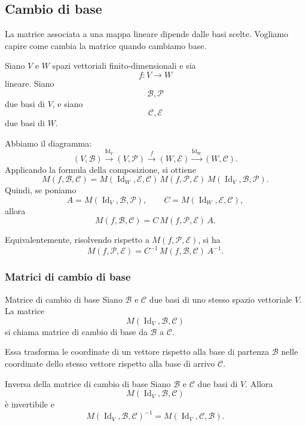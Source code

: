 \documentclass[a4paper]{article}
\begin{document}
\subsection{Cambio di base}

La matrice associata a una mappa lineare dipende dalle basi scelte. Vogliamo capire come cambia la matrice quando cambiamo base.

Siano \(V\) e \(W\) spazi vettoriali finito-dimensionali e sia
\[
    f:V\to W
\]
lineare. Siano
\[
    \mathcal{B},\mathcal{P}
\]
due basi di \(V\), e siano
\[
    \mathcal{C},\mathcal{E}
\]
due basi di \(W\).

Abbiamo il diagramma:
\[
    (V,\mathcal{B})
    \xrightarrow{\operatorname{Id}_V}
    (V,\mathcal{P})
    \xrightarrow{f}
    (W,\mathcal{E})
    \xrightarrow{\operatorname{Id}_W}
    (W,\mathcal{C}).
\]
Applicando la formula della composizione, si ottiene
\[
    M(f,\mathcal{B},\mathcal{C})
    =
    M(\operatorname{Id}_W,\mathcal{E},\mathcal{C})\,
    M(f,\mathcal{P},\mathcal{E})\,
    M(\operatorname{Id}_V,\mathcal{B},\mathcal{P}).
\]
Quindi, se poniamo
\[
    A=M(\operatorname{Id}_V,\mathcal{B},\mathcal{P}),
    \qquad
    C=M(\operatorname{Id}_W,\mathcal{E},\mathcal{C}),
\]
allora
\[
    M(f,\mathcal{B},\mathcal{C})
    =
    C\,M(f,\mathcal{P},\mathcal{E})\,A.
\]

Equivalentemente, risolvendo rispetto a \(M(f,\mathcal{P},\mathcal{E})\), si ha
\[
    M(f,\mathcal{P},\mathcal{E})
    =
    C^{-1}\,M(f,\mathcal{B},\mathcal{C})\,A^{-1}.
\]

\subsubsection{Matrici di cambio di base}

\begin{snippetdefinition}{Matrice di cambio di base}
    Siano \(\mathcal{B}\) e \(\mathcal{C}\) due basi di uno stesso spazio vettoriale \(V\). La matrice
    \[
        M(\operatorname{Id}_V,\mathcal{B},\mathcal{C})
    \]
    si chiama matrice di cambio di base da \(\mathcal{B}\) a \(\mathcal{C}\).

    Essa trasforma le coordinate di un vettore rispetto alla base di partenza \(\mathcal{B}\) nelle coordinate dello stesso vettore rispetto alla base di arrivo \(\mathcal{C}\).
\end{snippetdefinition}

\begin{snippetproposition}{Inversa della matrice di cambio di base}
    Siano \(\mathcal{B}\) e \(\mathcal{C}\) due basi di \(V\). Allora
    \[
        M(\operatorname{Id}_V,\mathcal{B},\mathcal{C})
    \]
    è invertibile e
    \[
        M(\operatorname{Id}_V,\mathcal{B},\mathcal{C})^{-1}
        =
        M(\operatorname{Id}_V,\mathcal{C},\mathcal{B}).
    \]
\end{snippetproposition}
\end{document}
